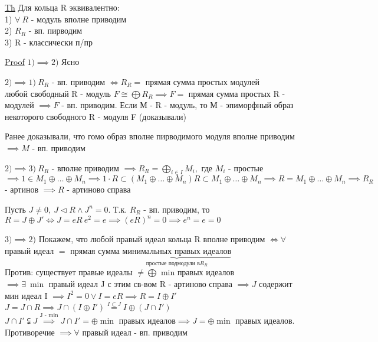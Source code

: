 \documentclass[a4paper]{article}
\begin{document}
\begin{tcolorbox}
\underline{Th} Для кольца R эквивалентно:\\
1) $ \forall \ R  $ - модуль вполне приводим\\
2) $ R_R $ - вп. пирводим\\
3) R - классически п/пр

\underline{Proof} $ 1) \implies 2) $ Ясно

$ 2) \implies 1)  \ R_R $ - вп. приводим $ \iff R_R = $ прямая сумма простых модулей \\
любой свободный R - модуль $ F \cong \bigoplus R_R \implies F =  $ прямая сумма
простых R - модулей $ \implies F $ - вп. приводим. Если М - R - модуль, то М - 
эпиморфный образ некоторого свободного R - модуля F (доказывали)

Ранее доказывали, что гомо образ вполне пирводимого модуля вполне приводим
$ \implies M $ - вп. приводим

$ 2) \implies 3) \ R_R  $ - вполне приводим $ \implies R_R = \bigoplus_{i \in I}
M_i, $ где $ M_i $ - простые $ \implies 1 \in M_1 \oplus \dots \oplus M_n \implies
1 \cdot R \subset (M_1 \oplus \dots \oplus M_n) R \subset M_1 \oplus \dots \oplus
M_n \implies R = M_1 \oplus \dots \oplus M_n \implies R_R $ - артинов $\implies
 R $ - артиново справа

Пусть $ J \neq 0, \ J \lhd R \land J^{n} = 0. $ Т.к. $ R_R $ - вп. приводим,
то $ R = J \oplus J' \iff J = eR \ e^2 = e \implies (eR)^{n} = 0 \implies e^{n}
= e = 0$ 

$ 3) \implies 2) $ Покажем, что любой правый идеал кольца R вполне приводим
$ \iff \forall  $ правый идеал $ =  $ прямая сумма $
\underbrace{\text{минимальных правых идеалов}}_{\text{простые подмодули в} R_R} $\\
Против: существует правые идеалы $ \neq \bigoplus $ min правых идеалов \\
$ \implies \exists \ \min \text{ правый идеал J с этим св-вом}$ R - артиново справа
$ \implies J  $ содержит мин идеал I $ \implies I^2 = 0 \lor I = eR \implies R =
I \oplus I'$\\
$ J = J \cap R \implies J \cap (I \oplus I') \stackrel{I \subset J}{=}
I \oplus (J \cap I')$ \\
$ J \cap I' \subsetneqq J \stackrel{\text{J - min}}{\implies} J \cap I' = 
\oplus \min \text{ правых идеалов} \implies J = \oplus \min \text{ правых идеалов}$.
Противоречие $ \implies \forall $ правый идеал - вп. приводим
\end{tcolorbox}
\end{document}

